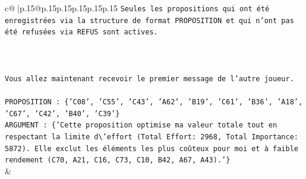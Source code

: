 \documentclass{article}
\begin{document}
{\begin{supertabular}{c@{$\;$}|p{.15\linewidth}@{}p{.15\linewidth}p{.15\linewidth}p{.15\linewidth}p{.15\linewidth}p{.15\linewidth}}
{{{\texttt{Seules les propositions qui ont été enregistrées via la structure de format PROPOSITION et qui n'ont pas été refusées via REFUS sont actives.} \\
\\ 
\\ 
\\ 
\texttt{Vous allez maintenant recevoir le premier message de l'autre joueur.} \\
\\ 
\texttt{PROPOSITION : \{'C08', 'C55', 'C43', 'A62', 'B19', 'C61', 'B36', 'A18', 'C67', 'C42', 'B40', 'C39'\}} \\
\texttt{ARGUMENT : \{'Cette proposition optimise ma valeur totale tout en respectant la limite d\textbackslash{}'effort (Total Effort: 2968, Total Importance: 5872). Elle exclut les éléments les plus coûteux pour moi et à faible rendement (C70, A21, C16, C73, C10, B42, A67, A43).'\}} \\
            }
        }
    }
    & \\ \\


\end{supertabular}}
\end{document}
